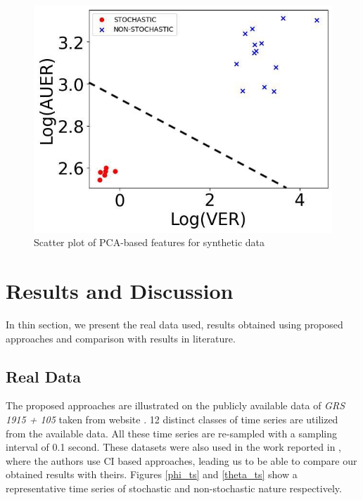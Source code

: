 \documentclass[journal]{IEEEtran}
\begin{document}
\begin{figure}[ht]
\centering
\includegraphics[width=0.8\linewidth]{Scatterplot_poc_variance_area_threshold_7.jpg}
\caption{Scatter plot of PCA-based features for synthetic data}
\label{scatterplot}
\end{figure}


%

\section{Results and Discussion}
In thin section, we present  the real data used, results obtained using proposed approaches and comparison with results in literature.

\subsection{Real Data}
The proposed approaches are illustrated on the publicly available data of \textit{GRS 1915 + 105} taken from website \cite{xte}. 12 distinct classes of time series are utilized from the available data. All these time series are re-sampled with a sampling interval of 0.1 second. These datasets  were  also used in the work reported in \cite{Adegoke2018}, where the authors use CI based approaches, leading us to be able to compare our obtained results with theirs. Figures \ref{phi_ts} and \ref{theta_ts} show a representative time series of stochastic and non-stochastic  nature respectively.
\end{document}
